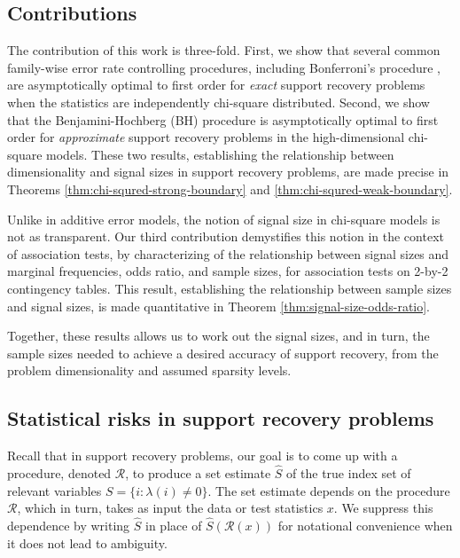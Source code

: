 \subsection{Contributions}

The contribution of this work is three-fold.
First, we show that several common family-wise error rate controlling procedures, including Bonferroni's procedure \cite{dunn1961multiple}, are asymptotically optimal to first order for \emph{exact} support recovery problems when the statistics are independently chi-square distributed.
Second, we show that the Benjamini-Hochberg (BH) procedure \cite{benjamini1995controlling} is asymptotically optimal to first order for \emph{approximate} support recovery problems in the high-dimensional chi-square models.
These two results, establishing the relationship between dimensionality and signal sizes in support recovery problems, are made precise in Theorems \ref{thm:chi-squred-strong-boundary} and \ref{thm:chi-squred-weak-boundary}.

Unlike in additive error models, the notion of signal size in chi-square models is not as transparent.
Our third contribution demystifies this notion in the context of association tests, by characterizing of the relationship between signal sizes and marginal frequencies, odds ratio, and sample sizes, for association tests on 2-by-2 contingency tables.
This result, establishing the relationship between sample sizes and signal sizes, is made quantitative in Theorem \ref{thm:signal-size-odds-ratio}.

Together, these results allows us to work out the signal sizes, and in turn, the sample sizes needed to achieve a desired accuracy of support recovery, from the problem dimensionality and assumed sparsity levels.

\subsection{Statistical risks in support recovery problems}
\label{subsec:risks}

Recall that in support recovery problems, our goal is to come up with a procedure, denoted $\mathcal R$, to produce a set estimate $\widehat{S}$ of the true index set of relevant variables  $S=\{i:\lambda(i)\neq 0\}$.
The set estimate depends on the procedure $\mathcal{R}$, which in turn, takes as input the data or test statistics $x$.
We suppress this dependence by writing $\widehat{S}$ in place of $\widehat{S}(\mathcal{R}(x))$ for notational convenience when it does not lead to ambiguity.

